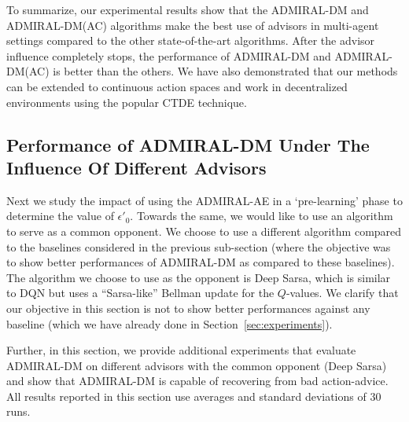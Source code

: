 \documentclass[jair, twoside,11pt,theapa]{article}
\begin{document}
To summarize, our experimental results show that the ADMIRAL-DM and ADMIRAL-DM(AC) algorithms  make the best use of advisors in multi-agent settings compared to the other state-of-the-art algorithms. After the advisor influence completely stops, the performance of ADMIRAL-DM and ADMIRAL-DM(AC) is better than the others. We have also demonstrated that our methods can be extended to continuous action spaces and work in decentralized environments using the popular CTDE technique. 






 




\subsection{Performance of ADMIRAL-DM Under The Influence Of Different Advisors}\label{sec:pommerman}


Next we  study the impact of using the ADMIRAL-AE in a `pre-learning' phase to determine the value of $\epsilon'_0$. Towards the same, we would like to use an algorithm to serve as a common opponent. We choose to use a different algorithm compared to the baselines considered in the previous sub-section (where the objective was to show better performances of ADMIRAL-DM as compared to these baselines). The algorithm we choose to use as the opponent is Deep Sarsa, which is similar to DQN but uses a ``Sarsa-like'' \citep{sutton1998introduction} Bellman update for the $Q$-values. We clarify that our objective in this section is not to show better performances against any baseline (which we have already done in Section~\ref{sec:experiments}). 

Further, in this section, we provide additional experiments that evaluate ADMIRAL-DM on different advisors with the common opponent (Deep Sarsa) and show that ADMIRAL-DM is capable of recovering from bad action-advice. All results reported in this section use averages and standard deviations of 30 runs. 
\end{document}
